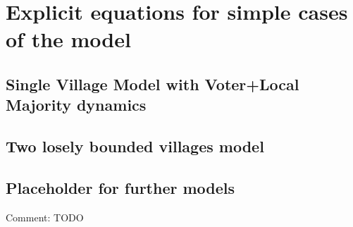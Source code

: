 \section{Explicit equations for simple cases of the model}
\subsection{Single Village Model with Voter+Local Majority dynamics}
\subsection{Two losely bounded villages model}
\subsection{Placeholder for further models}
Comment: TODO
